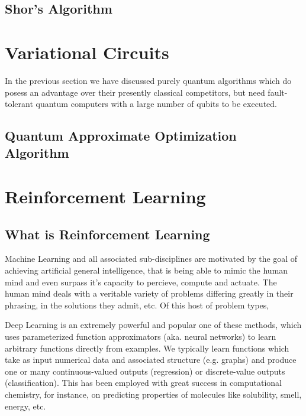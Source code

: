 \subsection{Shor's Algorithm}



\section{Variational Circuits}
\label{sec:variational-circuits}

In the previous section we have discussed purely quantum algorithms which do posess an advantage over their presently classical competitors, but need fault-tolerant quantum computers with a large number of qubits to be executed.

\subsection{Quantum Approximate Optimization Algorithm}
\label{sec:variational-circuits-qaoa}


\section{Reinforcement Learning}

\subsection{What is Reinforcement Learning}

Machine Learning and all associated sub-disciplines are motivated by the goal of achieving artificial general intelligence, that is being able to mimic the human mind and even surpass it's capacity to percieve, compute and actuate. The human mind deals with a veritable variety of problems differing greatly in their phrasing, in the solutions they admit, etc. Of this host of problem types, 

Deep Learning is an extremely powerful and popular one of these methods, which uses parameterized function approximators (aka. neural networks) to learn arbitrary functions directly from examples. We typically learn functions which take as input numerical data and associated structure (e.g. graphs) and produce one or many continuous-valued outputs (regression) or discrete-value outputs (classification). This has been employed with great success in computational chemistry, for instance, on predicting properties of molecules like solubility, smell, energy, etc. %

